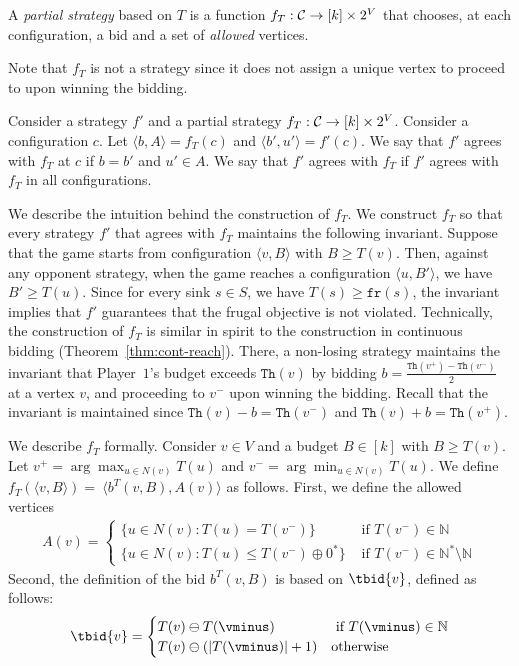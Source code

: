\documentclass{article}\providecommand{\nequiv}{\not\equiv}\usepackage[a4paper,margin=20mm]{geometry}
\newcommand{\PO}{Player~$1$\xspace}
\newcommand{\C}{{\cal C}}
\newcommand{\fr}{\texttt{fr}}
\newcommand{\Nat}{\mathbb{N}}
\newcommand{\Natstro}{\mathbb{N}^* \setminus \mathbb{N}}
\newcommand{\thresh}{\texttt{Th}\xspace}
\newcommand{\zug}[1]{\langle #1  \rangle}
\renewcommand{\set}[1]{\{ #1  \}}
\newcommand{\succb}[1]{#1 \oplus 0^*\xspace}
\newcommand{\absolut}[1]{|#1|}
\begin{document}
\begin{definition}
A {\em partial strategy} based on \(T\) is a function \(f_T: \C \rightarrow [k] \times 2^V\) that chooses, at each configuration, a bid and a set of {\em allowed} vertices. 
\end{definition}
Note that $f_T$ is not a strategy since it does not assign a unique vertex to proceed to upon winning the bidding. 
 
\begin{definition}
Consider a strategy \(f'\) and a partial strategy $f_T: \C \rightarrow [k] \times 2^V$. Consider a configuration $c$. Let \(\zug{b, A} = f_T(c)\) and \(\zug{b', u'} = f'(c)\). We say that $f'$ agrees with $f_T$ at $c$ if $b=b'$ and $u' \in A$. We say that $f'$ agrees with \(f_T\) if $f'$ agrees with $f_T$ in all configurations. 
\end{definition}

We describe the intuition behind the construction of $f_T$. We construct $f_T$ so that every strategy $f'$ that agrees with $f_T$ maintains the following invariant. 
Suppose that the game starts from configuration $\zug{v, B}$ with $B \geq T(v)$. Then, against any opponent strategy, when the game reaches a configuration $\zug{u, B'}$, we have $B' \geq T(u)$. Since for every sink $s \in S$, we have $T(s) \geq \fr(s)$, the invariant implies that $f'$ guarantees that the frugal objective is not violated. Technically, the construction of $f_T$ is similar in spirit to the construction in continuous bidding (Theorem~\ref{thm:cont-reach}). There, a non-losing strategy maintains the invariant that \PO's budget exceeds $\thresh(v)$ by bidding $b = \frac{\thresh(v^+) - \thresh(v^-)}{2}$ at a vertex $v$, and proceeding to $v^-$ upon winning the bidding. Recall that the invariant is maintained since $\thresh(v) - b = \thresh(v^-)$ and $\thresh(v) + b = \thresh(v^+)$. 

We describe $f_T$ formally. Consider $v \in V$ and a budget $B \in [k]$ with $B \geq T(v)$. Let $v^+ = \arg \max_{u \in N(v)} T(u)$ and $v^- = \arg \min_{u \in N(v)} T(u)$. We define $f_T(\zug{v, B}) =~\zug{b^T(v,B), A(v)}$ as follows.
First, we define the allowed vertices
\begin{align}
\label{eq: allowedvertices}
A(v) = \begin{cases}
\set{u \in N(v): T(u) = T(v^-)} & \text{ if } T(v^-) \in \Nat \\
\set{u \in N(v): T(u) \leq \succb{T(v^-)}} & \text{ if } T(v^-) \in \Natstro
\end{cases}
\end{align}
Second, the definition of the bid \(b^T(v,B)\) is based on \(\tbid{v}\), defined as follows: 
\begin{align}
	\label{eq: bids}
	\tbid{v} = 
	\begin{cases}
		T(v) \ominus T(\vminus) &\text{~if~} T(\vminus) \in \Nat\\
		T(v) \ominus (\absolut{T(\vminus)} + 1) &\text{otherwise}
	\end{cases}
\end{align}
\end{document}

